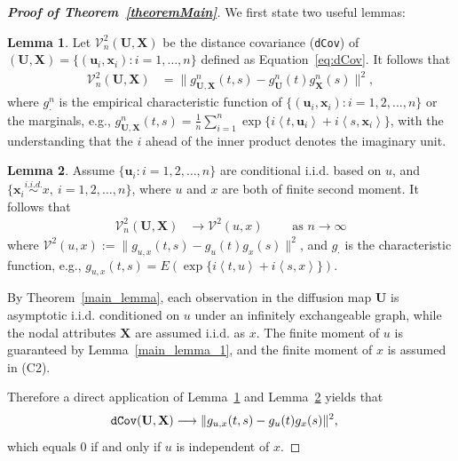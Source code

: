 \documentclass[12pt]{article}
\theoremstyle{definition}
\newtheorem{lemma}{Lemma}
\begin{document}
	\begin{proof}[\textbf{Proof of Theorem~\ref{theoremMain}}]
		
		We first state two useful lemmas:
		\begin{lemma}
			\label{lemma2}
			Let $\mathcal{V}^2_{n}(\mathbf{U}, \mathbf{X})$ be the distance covariance (\texttt{dCov}) of $(\mathbf{U}, \mathbf{X}) = \{  ( \mathbf{u}_{i}, \mathbf{x}_{i}  )  : i = 1, \ldots, n \}$ defined as Equation~\ref{eq:dCov}.
			It follows that
			\begin{eqnarray}
				\mathcal{V}^{2}_{n}(\mathbf{U},\mathbf{X}) &=   \|g_{\mathbf{U},\mathbf{X}}^{n}(t,s)-g_{\mathbf{U}}^{n}(t)g_{\mathbf{X}}^{n}(s)\|^{2},
			\end{eqnarray}
			where $g_{\cdot}^{n}$ is the empirical characteristic function of $\{(\mathbf{u}_{i},\mathbf{x}_{i}) : i=1,2,...,n\}$ or the marginals, e.g., $g_{\mathbf{U},\mathbf{X}}^{n}(t,s)=\frac{1}{n}\sum_{i=1}^{n}\exp\{i \left\langle t,\mathbf{u}_{i} \right\rangle+i \left\langle s,\mathbf{x}_{i} \right\rangle\}$, with the understanding that the $i$ ahead of the inner product denotes the imaginary unit.
		\end{lemma}
		
		\begin{lemma}
			\label{lemma3}
			Assume $\{ \mathbf{u}_{i} : i = 1,2, \ldots, n \}$ are conditional i.i.d. based on $u$, and $\{\mathbf{x}_{i} \stackrel{i.i.d.}{\sim} x,~i = 1, 2, \ldots, n\}$, where $u$ and $x$ are both of finite second moment. It follows that
			\begin{eqnarray}
				\mathcal{V}_{n}^{2}(\mathbf{U},\mathbf{X}) &\longrightarrow \mathcal{V}^{2}(u,x) \quad \quad \mbox{ as } n \rightarrow \infty
				\label{eq:conv1}
			\end{eqnarray}
			where $\mathcal{V}^{2} (u,x) := \| g_{u,x}(t,s) - g_{u}(t) g_{x}(s) \|^2$, and $g_{\cdot}$ is the characteristic function, e.g., $g_{u,x}(t,s) = E(\exp\{i \left\langle t,u \right\rangle  +i \left\langle  s,x\right\rangle \})$.
		\end{lemma}
		
		By Theorem~\ref{main_lemma}, each observation in the diffusion map $\mathbf{U}$ is asymptotic i.i.d. conditioned on $u$ under an infinitely exchangeable graph, while the nodal attributes $\mathbf{X}$ are assumed i.i.d. as $x$. The finite moment of $u$ is guaranteed by Lemma~\ref{main_lemma_1}, and the finite moment of $x$ is assumed in (C2).
		
		Therefore a direct application of Lemma~\ref{lemma2} and Lemma~\ref{lemma3} yields that
		\begin{eqnarray}
			\mbox{\texttt{dCov}}(\mathbf{U},\mathbf{X}) &\longrightarrow \| g_{u,x}(t,s) - g_{u}(t) g_{x}(s) \|^2,
		\end{eqnarray}
		which equals $0$ if and only if $u$ is independent of $x$.
		

\end{proof}
\end{document}
